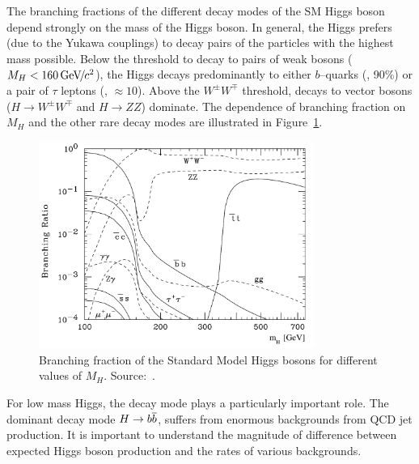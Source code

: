 The branching fractions of the different decay modes of the SM Higgs boson
depend strongly on the mass of the Higgs boson.  In general, the Higgs prefers
(due to the Yukawa couplings) to decay pairs of the particles with the highest
mass possible.  Below the threshold to decay to pairs of weak bosons ($M_H <
160 {\,\text{Ge\hspace{-.08em}V\hspace{-0.16em}/\hspace{-0.08em}}c^\text{2}}$), the Higgs decays predominantly to either $b$--quarks (\bbbar,
90\%) or a pair of $\tau$ leptons (\TT, $\approx 10$).  Above the $W^\pm W^\mp$
threshold, decays to vector bosons ($H \to W^\pm W^\mp$ and $H \to ZZ$)
dominate.  The dependence of branching fraction on $M_H$ and the other rare
decay modes are illustrated in Figure~\ref{fig:SMHiggsBR}.  
\begin{figure}
  \centering
  \includegraphics[width=90mm,angle=0]{theory_chapter/figures/smhiggsbr2_mh.pdf}
  \caption[SM Higgs branching fractions]{Branching fraction of the Standard
  Model Higgs bosons for different values of $M_H$. Source:~\cite{PDG}.}
  \label{fig:SMHiggsBR}
\end{figure}
For low mass Higgs,
the \TT decay mode plays a particularly important role.  The dominant decay mode
$H \to {b\overline{b}}$, suffers from enormous backgrounds from QCD jet production.
It is important to understand the magnitude of difference between expected Higgs
boson production and the rates of various backgrounds.
